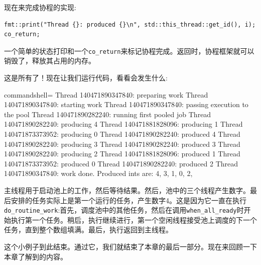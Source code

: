 现在来完成协程的实现:

\begin{lstlisting}[style=styleCXX]
 fmt::print("Thread {}: produced {}\n", std::this_thread::get_id(), i);
co_return;
\end{lstlisting}

一个简单的状态打印和一个\texttt{co\_return}来标记协程完成。返回时，协程框架就可以销毁了，释放其占用的内存。

这是所有了！现在让我们运行代码，看看会发生什么:

\begin{tcblisting}{commandshell={}}
Thread 140471890347840: preparing work
Thread 140471890347840: starting work
Thread 140471890347840: passing execution to the pool
Thread 140471890282240: running first pooled job
Thread 140471890282240: producing 4
Thread 140471881828096: producing 1
Thread 140471873373952: producing 0
Thread 140471890282240: produced 4
Thread 140471890282240: producing 3
Thread 140471890282240: produced 3
Thread 140471890282240: producing 2
Thread 140471881828096: produced 1
Thread 140471873373952: produced 0
Thread 140471890282240: produced 2
Thread 140471890347840: work done. Produced ints are: 4, 3, 1, 0, 2,
\end{tcblisting}

主线程用于启动池上的工作，然后等待结果。然后，池中的三个线程产生数字。最后安排的任务实际上是第一个运行的任务，产生数字4。这是因为它一直在执行\texttt{do\_routine\_work}:首先，调度池中的其他任务，然后在调用\texttt{when\_all\_ready}时开始执行第一个任务。稍后，执行继续进行，第一个空闲线程接受池上调度的下一个任务，直到整个数组填满。最后，执行返回到主线程。

这个小例子到此结束。通过它，我们就结束了本章的最后一部分。现在来回顾一下本章了解到的内容。


